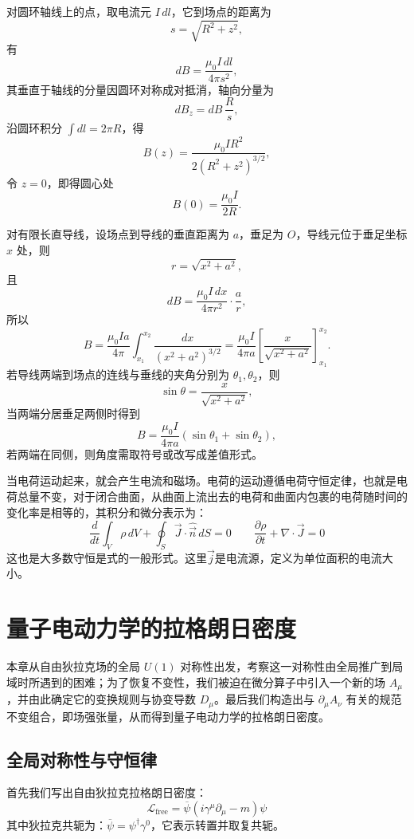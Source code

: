 \documentclass[UTF8]{ctexbook}
\begin{document}
对圆环轴线上的点，取电流元 \(I\,dl\)，它到场点的距离为
\[
s=\sqrt{R^2+z^2},
\]
有
\[
dB=\frac{\mu_0 I\,dl}{4\pi s^2},
\]
其垂直于轴线的分量因圆环对称成对抵消，轴向分量为
\[
dB_z=dB\,\frac{R}{s},
\]
沿圆环积分 \(\int dl=2\pi R\)，得
\[
B(z)=\frac{\mu_0 I R^2}{2(R^2+z^2)^{3/2}},
\]
令 \(z=0\)，即得圆心处
\[
B(0)=\frac{\mu_0 I}{2R}.
\]

对有限长直导线，设场点到导线的垂直距离为 \(a\)，垂足为 \(O\)，导线元位于垂足坐标 \(x\) 处，则
\[
r=\sqrt{x^2+a^2},
\]
且
\[
dB=\frac{\mu_0 I\,dx}{4\pi r^2}\cdot\frac{a}{r},
\]
所以
\[
B=\frac{\mu_0 I a}{4\pi}\int_{x_1}^{x_2}\frac{dx}{(x^2+a^2)^{3/2}}
=\frac{\mu_0 I}{4\pi a}\left[\frac{x}{\sqrt{x^2+a^2}}\right]_{x_1}^{x_2}.
\]
若导线两端到场点的连线与垂线的夹角分别为 \(\theta_1,\theta_2\)，则
\[
\sin\theta=\frac{x}{\sqrt{x^2+a^2}},
\]
当两端分居垂足两侧时得到
\[
B=\frac{\mu_0 I}{4\pi a}\left(\sin\theta_1+\sin\theta_2\right),
\]
若两端在同侧，则角度需取符号或改写成差值形式。



当电荷运动起来，就会产生电流和磁场。电荷的运动遵循电荷守恒定律，也就是电荷总量不变，对于闭合曲面，从曲面上流出去的电荷和曲面内包裹的电荷随时间的变化率是相等的，其积分和微分表示为：
\[
\frac{d}{dt}\int_V \rho\,dV
+
\oint_S \vec{J}\cdot\hat{\vec{n}}\,dS
=0
\qquad
\frac{\partial \rho}{\partial t}
+
\nabla\cdot\vec{J}
=0
\]
这也是大多数守恒是式的一般形式。这里$\vec{j}$是电流源，定义为单位面积的电流大小。

\newpage
\section{量子电动力学的拉格朗日密度}

本章从自由狄拉克场的全局 $U(1)$ 对称性出发，考察这一对称性由全局推广到局域时所遇到的困难；为了恢复不变性，我们被迫在微分算子中引入一个新的场 $A_{\mu}$，并由此确定它的变换规则与协变导数 $D_{\mu}$。最后我们构造出与 $\partial_{\mu}A_{\nu}$ 有关的规范不变组合，即场强张量，从而得到量子电动力学的拉格朗日密度。

\subsection{全局对称性与守恒律}

首先我们写出自由狄拉克拉格朗日密度：
\[
\mathcal{L}_{\text{free}}=\overline{\psi}\left( i\gamma^{\mu}\partial_{\mu}-m \right)\psi
\]
其中狄拉克共轭为：$\overline{\psi}=\psi^{\dagger}\gamma^{0}$，它表示转置并取复共轭。
\end{document}
